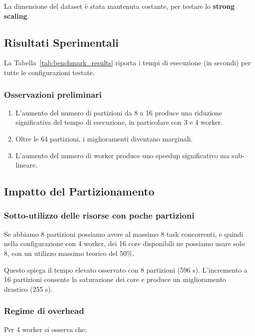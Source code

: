 \documentclass{article}
\begin{document}
La dimensione del dataset è stata mantenuta costante, per testare lo \textbf{strong scaling}.

\subsection{Risultati Sperimentali}

La Tabella~\ref{tab:benchmark_results} riporta i tempi di esecuzione (in secondi) per tutte le configurazioni testate.

\subsubsection{Osservazioni preliminari}

\begin{enumerate}
    \item L'aumento del numero di partizioni da 8 a 16 produce una riduzione significativa del tempo di esecuzione, in particolare con 3 e 4 worker.
    \item Oltre le 64 partizioni, i miglioramenti diventano marginali.
    \item L'aumento del numero di worker produce uno speedup significativo ma sub-lineare.
\end{enumerate}

\subsection{Impatto del Partizionamento}

\subsubsection{Sotto-utilizzo delle risorse con poche partizioni}

Se abbiamo 8 partizioni possiamo avere al massimo 8 task concorrenti, e quindi nella configurazione con 4 worker, dei 16 core disponibili ne possiamo usare solo 8, con un utilizzo massimo teorico del 50\%.

Questo spiega il tempo elevato osservato con 8 partizioni (596 s).  
L'incremento a 16 partizioni consente la saturazione dei core e produce un miglioramento drastico (255 s). 

\subsubsection{Regime di overhead}

Per 4 worker si osserva che:
\end{document}
